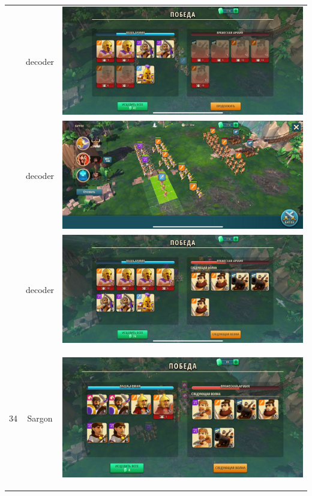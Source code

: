 \begin{longtable}{|c|c|c|}
	& decoder &
	\includegraphics[width=0.75\linewidth]{./parts/media/TreasureHunt/33/decoder/photo_2022-04-07_10-02-27.jpg} \\
	& decoder &
	\includegraphics[width=0.75\linewidth]{./parts/media/TreasureHunt/33/decoder/photo_2022-04-07_10-02-23.jpg} \\
	& decoder &
	\includegraphics[width=0.75\linewidth]{./parts/media/TreasureHunt/33/decoder/photo_2022-04-07_10-02-19.jpg} \\
	\hline
	\multirow{8}{*}{34} & Sargon &
	\hypertarget{fight34}{\includegraphics[width=0.75\linewidth]{./parts/media/TreasureHunt/34/sargon/photo_2022-04-07_10-08-16.jpg}} \\

\end{longtable}
